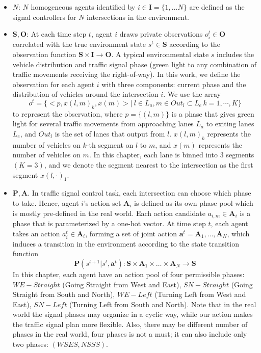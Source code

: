 \begin{itemize}[leftmargin=*]
    \item $N$: $N$ homogeneous agents identified by $i\in\pmb{I}=\{1,\dots N\}$ are defined as the signal controllers for $N$ intersections in the environment.
    \item $\pmb{S},\pmb{O}$: At each time step $t$, agent $i$ draws private observations $o^t_i\in \pmb{O}$ correlated with the true environment state $s^t\in \pmb{S}$ according to the observation function $\pmb{S}\times \pmb{I}\rightarrow \pmb{O}$. A typical environmental state $s$ includes the vehicle distribution and traffic signal phase (green light to any combination of traffic movements receiving the right-of-way). In this work, we define the observation for each agent $i$ with three components: current phase and the distribution of vehicles around the intersection $i$. We use the array 
    \begin{equation}
    \label{eq:observation}
    o^t=\{<p, x(l,m)_k, x(m)>|\ l\in L_a, m\in Out_l \subset L_e\, k=1,\cdots, K\} 
    \end{equation}
    to represent the observation, where $p=\{(l,m)\}$ is a phase that gives green light for several traffic movements from approaching lanes $L_a$ to exiting lanes $L_e$, and $Out_l$ is the set of lanes that output from $l$. $x(l,m)_k$ represents the number of vehicles on $k$-th segment on $l$ to $m$, and $x(m)$ represents the number of vehicles on $m$. In this chapter, each lane is binned into 3 segments $(K=3)$, and we denote the segment nearest to the intersection as the first segment $x(l,\cdot)_1$.
    \item $\pmb{P},\pmb{A}$. In traffic signal control task, each intersection can choose which phase to take. Hence, agent $i$'s action set $\pmb{A}_i$ is defined as its own phase pool which is mostly pre-defined in the real world. Each action candidate $a_{i,m}\in \pmb{A}_i$ is a phase that is parameterized by a one-hot vector. At time step $t$, each agent takes an action $a_i^t\in \pmb{A}_i$, forming a set of joint action $\pmb{a}^t=\pmb{A}_1,\dots,\pmb{A}_N$, which induces a transition in the environment according to the state transition function
    \begin{equation}
    \pmb{P}(s^{t+1}|s^t,\pmb{a}^t): \pmb{S}\times \pmb{A}_1 \times \dots \times \pmb{A}_N \rightarrow \pmb{S}
    \end{equation}
    In this chapter, each agent have an action pool of four permissible phases: $WE-Straight$ (Going Straight from West and East), $SN-Straight$ (Going Straight from South and North), $WE-Left$ (Turning Left from West and East), $SN-Left$ (Turning Left from South and North). Note that in the real world the signal phases may organize in a cyclic way, while our action makes the traffic signal plan more flexible. Also, there may be different number of phases in the real world, four phases is not a must; it can also include only two phases:  $(WSES, NSSS)$.

\end{itemize}
